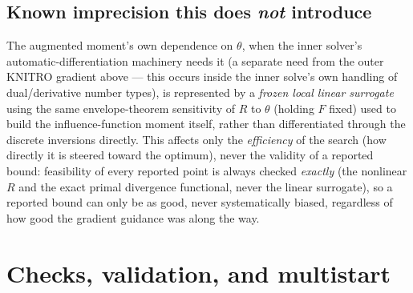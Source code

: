\documentclass[11pt]{article}
\begin{document}
\subsection{Known imprecision this does \emph{not} introduce}
The augmented moment's own dependence on $\theta$, when the inner solver's automatic-differentiation
machinery needs it (a separate need from the outer KNITRO gradient above — this occurs inside the
inner solve's own handling of dual/derivative number types), is represented by a \emph{frozen local
linear surrogate} using the same envelope-theorem sensitivity of $R$ to $\theta$ (holding $F$ fixed)
used to build the influence-function moment itself, rather than differentiated through the discrete
inversions directly. This affects only the \emph{efficiency} of the search (how directly it is
steered toward the optimum), never the validity of a reported bound: feasibility of every reported
point is always checked \emph{exactly} (the nonlinear $R$ and the exact primal divergence functional,
never the linear surrogate), so a reported bound can only be as good, never systematically biased,
regardless of how good the gradient guidance was along the way.

\section{Checks, validation, and multistart}
\label{sec:checks}
\end{document}
